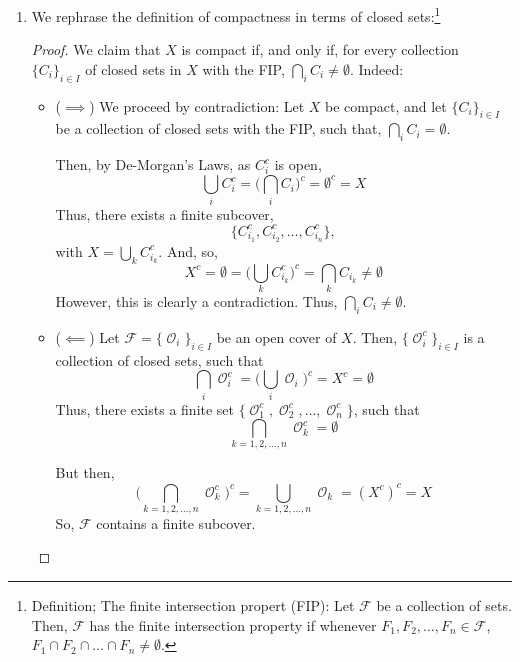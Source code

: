 \documentclass{book}
\DeclareMathOperator*{\Ocal}{\mathcal{O}}
\begin{document}
\begin{enumerate}[(1)]
    \item We rephrase the definition of compactness in terms of closed sets:\footnote{Definition; The finite intersection propert (FIP): Let $\mathcal{F}$ be a collection of sets. Then, $\mathcal{F}$ has the finite intersection property if whenever $F_1, F_2, \dots, F_n \in \mathcal{F}$, $F_1 \cap F_2 \cap \dots \cap F_n \neq \emptyset$.} 
        \begin{proof} We claim that $X$ is compact if, and only if, for every collection $\{C_i\}_{i \in I}$ of closed sets in $X$ with the FIP, $\bigcap_i C_i \neq \emptyset$. 
            Indeed:
            \begin{itemize}
                \item[] ($\implies$) We proceed by contradiction: Let $X$ be compact, and let $\{C_i\}_{i \in I}$ be a collection of closed sets with the FIP, such that, $\bigcap_i C_i = \emptyset$. 
                    \par Then, by De-Morgan's Laws, as $C_i^c$ is open, 
                    \[\bigcup_i C_i^c = \Big( \bigcap_i C_i \Big)^c = \emptyset^c = X\]
                    Thus, there exists a finite subcover, 
                    \[\{C_{i_1}^c, C_{i_2}^c, \dots, C_{i_n}^c\},\]
                    with $X = \bigcup_k C_{i_k}^c$. And, so, 
                    \[X^c = \emptyset = \Big(\bigcup_k C_{i_k}^c\Big)^c = \bigcap_k C_{i_k} \neq \emptyset\]
                    However, this is clearly a contradiction. Thus, $\bigcap_i C_i \neq \emptyset$. 

                \item[] ($\impliedby$) Let $\mathcal{F} = \{ {\Ocal}_i\}_{i \in I}$ be an open cover of $X$. Then, $\{{\Ocal}_i^c\}_{i \in I}$ is a collection of closed sets, such that 
                    \[\bigcap_i {{\Ocal}}_i^c = \Big( \bigcup_i {\Ocal}_i \Big)^c = X^c = \emptyset\]
                    Thus, there exists a finite set $\{{\Ocal}_1^c, {\Ocal}_2^c, \dots, {\Ocal}_n^c\}$, such that 
                    $$\bigcap_{k = 1,2, \dots , n} {\Ocal}_k^c = \emptyset $$ 
                    \par But then, 
                    \[\Big(\bigcap_{k = 1,2, \dots , n} {\Ocal}_k^c\Big)^c = \bigcup_{k = 1,2, \dots , n} {\Ocal}_k = (X^c)^c = X\]
                    So, $\mathcal{F}$ contains a finite subcover. 
            \end{itemize}
        \end{proof}
\end{enumerate}
\end{document}
